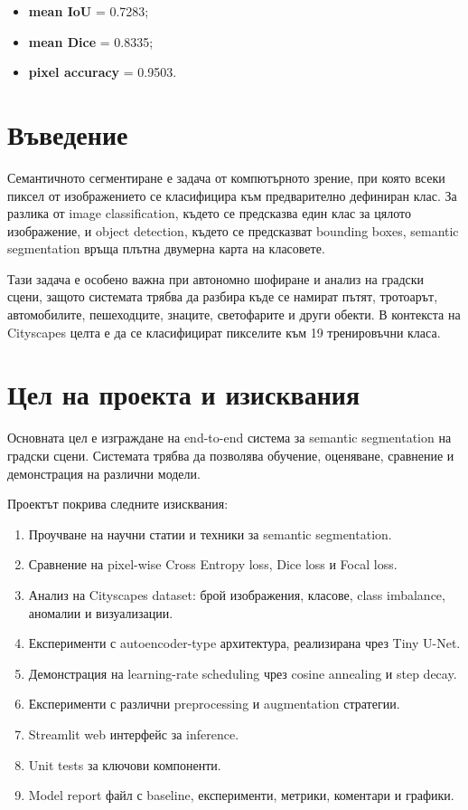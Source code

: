 \documentclass[12pt,a4paper]{article}
\newcommand{\metric}[1]{\textbf{#1}}
\begin{document}
\begin{itemize}
  \item \metric{mean IoU} = 0.7283;
  \item \metric{mean Dice} = 0.8335;
  \item \metric{pixel accuracy} = 0.9503.
\end{itemize}

\section{Въведение}

Семантичното сегментиране е задача от компютърното зрение, при която всеки пиксел от изображението се класифицира към предварително дефиниран клас. За разлика от image classification, където се предсказва един клас за цялото изображение, и object detection, където се предсказват bounding boxes, semantic segmentation връща плътна двумерна карта на класовете.

Тази задача е особено важна при автономно шофиране и анализ на градски сцени, защото системата трябва да разбира къде се намират пътят, тротоарът, автомобилите, пешеходците, знаците, светофарите и други обекти. В контекста на Cityscapes целта е да се класифицират пикселите към 19 тренировъчни класа.

\section{Цел на проекта и изисквания}

Основната цел е изграждане на end-to-end система за semantic segmentation на градски сцени. Системата трябва да позволява обучение, оценяване, сравнение и демонстрация на различни модели.

Проектът покрива следните изисквания:

\begin{enumerate}
  \item Проучване на научни статии и техники за semantic segmentation.
  \item Сравнение на pixel-wise Cross Entropy loss, Dice loss и Focal loss.
  \item Анализ на Cityscapes dataset: брой изображения, класове, class imbalance, аномалии и визуализации.
  \item Експерименти с autoencoder-type архитектура, реализирана чрез Tiny U-Net.
  \item Демонстрация на learning-rate scheduling чрез cosine annealing и step decay.
  \item Експерименти с различни preprocessing и augmentation стратегии.
  \item Streamlit web интерфейс за inference.
  \item Unit tests за ключови компоненти.
  \item Model report файл с baseline, експерименти, метрики, коментари и графики.
\end{enumerate}
\end{document}
